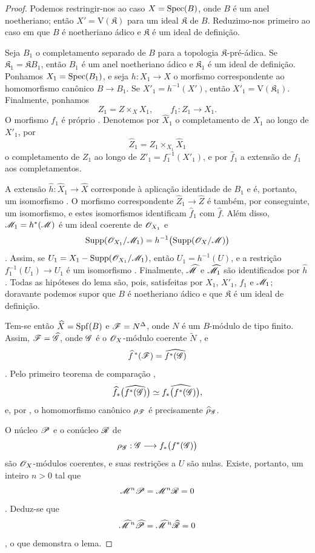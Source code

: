 \begin{proof}
Podemos restringir-nos ao caso $X=\operatorname{Spec}(B)$, onde $B$ é um
anel noetheriano; então $X'=\mathrm{V}(\mathfrak{K})$ para um ideal
$\mathfrak{K}$ de $B$. Reduzimo-nos primeiro ao caso em que $B$ é
noetheriano ádico e $\mathfrak{K}$ é um ideal de definição.

Seja $B_1$ o completamento separado de $B$ para a
topologia $\mathfrak{K}$-pré-ádica.
Se $\mathfrak{K}_1=\mathfrak{K}B_1$, então $B_1$ é um anel
noetheriano ádico e $\mathfrak{K}_1$ é um ideal de definição.
Ponhamos $X_1=\operatorname{Spec}(B_1)$, e seja $h:X_1\to X$ o morfismo
correspondente ao homomorfismo canônico $B\to B_1$. Se
$X'_1=h^{-1}(X')$, então $X'_1=\mathrm{V}(\mathfrak{K}_1)$. Finalmente,
ponhamos
\[
  Z_1=Z\times_X X_1,\qquad f_1:Z_1\longrightarrow X_1.
\]
O morfismo $f_1$ é próprio . Denotemos por
$\widehat{X}_1$ o completamento de $X_1$ ao longo de $X'_1$, por
\[
  \widehat{Z}_1=
  Z_1\times_{X_1}\widehat{X}_1
\]
o completamento de $Z_1$ ao longo de
$Z'_1=f_1^{-1}(X'_1)$, e por
$\widehat{f}_1$ a extensão de $f_1$ aos completamentos.

A extensão
$\widehat{h}:\widehat{X}_1\to\widehat{X}$ corresponde à
aplicação identidade de $B_1$ e é, portanto, um isomorfismo
. O morfismo correspondente
$\widehat{Z}_1\to\widehat{Z}$ é também, por conseguinte, um isomorfismo,
e estes isomorfismos identificam $\widehat{f}_1$ com
$\widehat{f}$. Além disso,
$\mathscr{M}_1=h^*(\mathscr{M})$ é um ideal coerente de $\mathscr{O}_{X_1}$ e
\[
  \operatorname{Supp}(\mathscr{O}_{X_1}/\mathscr{M}_1)
  =h^{-1}\bigl(\operatorname{Supp}(\mathscr{O}_X/\mathscr{M})\bigr)
\]
. Assim, se
$U_1=X_1-\operatorname{Supp}(\mathscr{O}_{X_1}/\mathscr{M}_1)$, então
$U_1=h^{-1}(U)$, e a restrição
$f_1^{-1}(U_1)\to U_1$ é um isomorfismo
. Finalmente, $\widehat{\mathscr{M}}$ e
$\widehat{\mathscr{M}}_1$ são identificados por $\widehat{h}$
. Todas as hipóteses do lema são, pois,
satisfeitas por $X_1$, $X'_1$, $f_1$ e $\mathscr{M}_1$; doravante
podemos supor que $B$ é noetheriano ádico e que $\mathfrak{K}$ é
um ideal de definição.

Tem-se então $\widehat{X}=\operatorname{Spf}(B)$ e
$\mathscr{F}=N^\Delta$, onde $N$ é um $B$-módulo de tipo finito. Assim,
$\mathscr{F}=\widehat{\mathscr{G}}$, onde $\mathscr{G}$ é o
$\mathscr{O}_X$-módulo coerente $\widetilde{N}$ , e
\[
  \widehat{f}^{\,*}(\mathscr{F})
  =\widehat{f^*(\mathscr{G})}
\]
. Pelo primeiro teorema de comparação
,
\[
  \widehat{f}_*
  \bigl(\widehat{f^*(\mathscr{G})}\bigr)
  \simeq
  \widehat{f_*\bigl(f^*(\mathscr{G})\bigr)},
\]
e, por , o homomorfismo canônico
$\rho_{\mathscr{F}}$ é precisamente $\widehat{\rho}_{\mathscr{G}}$.

O núcleo $\mathscr{P}$ e o conúcleo $\mathscr{R}$ de
\[
  \rho_{\mathscr{G}}:
  \mathscr{G}\longrightarrow f_*\bigl(f^*(\mathscr{G})\bigr)
\]
são $\mathscr{O}_X$-módulos coerentes, e suas restrições a $U$ são
nulas. Existe, portanto, um inteiro $n>0$ tal que
\[
  \mathscr{M}^n\mathscr{P}=\mathscr{M}^n\mathscr{R}=0
\]
. Deduz-se que
\[
  \widehat{\mathscr{M}}^{\,n}\widehat{\mathscr{P}}
  =
  \widehat{\mathscr{M}}^{\,n}\widehat{\mathscr{R}}
  =0
\]
 , o que demonstra o lema.
\end{proof}

